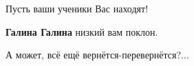 \begin{itemize}
Пусть ваши ученики Вас находят!

\begin{itemize}
 
\textbf{Галина Галина} низкий вам поклон.
\end{itemize}

 
А может, всё ещё вернётся-перевернётся?...


\end{itemize}

